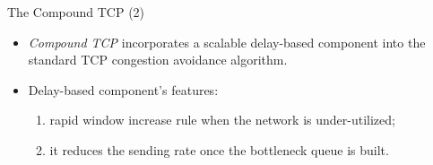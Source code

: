 \begin{frame}{The Compound TCP (2)}
        \begin{itemize}
		\item \textit{Compound TCP} incorporates a scalable delay-based component
		      into the standard TCP congestion avoidance algorithm.
		\item Delay-based component's features:
			\begin{enumerate}
				\item rapid window increase
		      	 	      rule when the network is under-utilized;
		      		\item it reduces the sending rate once the bottleneck queue is
		      		      built.
			\end{enumerate}
        \end{itemize}
\end{frame}
